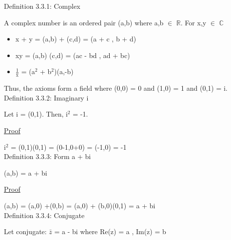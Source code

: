 { \color{blue} Definition 3.3.1: Complex } 
	
	\qquad A complex number is an ordered pair (a,b) where a,b $\in$ $ \mathbb{R} $.
	For x,y $\in$ $\mathbb{C}$
	\begin{itemize}[leftmargin=2cm, itemsep=0.4em]
		\item x + y = (a,b) + (c,d) = (a + c , b + d)
		\item xy = (a,b) (c,d) = (ac - bd , ad + bc)
		\item $\frac{1}{\text{x}}$  = (a$^2$ + b$^2$)(a,-b)
	\end{itemize}

	Thus, the axioms form a field where (0,0) = 0 and (1,0) = 1 and (0,1) = i. \\

{ \color{blue} Definition 3.3.2: Imaginary i } 
	
	\qquad Let i = (0,1). Then, i$^2$ = -1.

{ \color{magenta} \underline{Proof} } 
	
	i$^\text{2}$ = (0,1)(0,1) = (0-1,0+0) = (-1,0) = -1 \\

{ \color{blue} Definition 3.3.3: Form a + bi } 
	
	\qquad (a,b) = a + bi

{ \color{magenta} \underline{Proof} } 
	
	(a,b) = (a,0) +(0,b) = (a,0) + (b,0)(0,1) = a + bi \\

{ \color{blue} Definition 3.3.4: Conjugate }
	
	\qquad Let conjugate: $\bar{z}$ = a - bi where Re(z) = a , Im(z) = b \\

